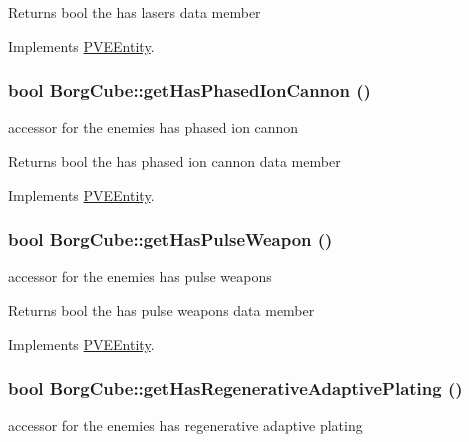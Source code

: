 \begin{DoxyReturn}{Returns}
bool the has lasers data member 
\end{DoxyReturn}


Implements \hyperlink{classPVEEntity}{PVEEntity}.

\hypertarget{classBorgCube_af7010edc4afc7ab22fe8bc8294156478}{
\subsubsection[{getHasPhasedIonCannon}]{\setlength{\rightskip}{0pt plus 5cm}bool BorgCube::getHasPhasedIonCannon ()}}
\label{d2/d93/classBorgCube_af7010edc4afc7ab22fe8bc8294156478}
accessor for the enemies has phased ion cannon

\begin{DoxyReturn}{Returns}
bool the has phased ion cannon data member 
\end{DoxyReturn}


Implements \hyperlink{classPVEEntity}{PVEEntity}.

\hypertarget{classBorgCube_aff18909b84ec3efb8aa26b6a3aa6cba0}{
\subsubsection[{getHasPulseWeapon}]{\setlength{\rightskip}{0pt plus 5cm}bool BorgCube::getHasPulseWeapon ()}}
\label{d2/d93/classBorgCube_aff18909b84ec3efb8aa26b6a3aa6cba0}
accessor for the enemies has pulse weapons

\begin{DoxyReturn}{Returns}
bool the has pulse weapons data member 
\end{DoxyReturn}


Implements \hyperlink{classPVEEntity}{PVEEntity}.

\hypertarget{classBorgCube_abd8457ff37b980ca21e58dee957046cb}{
\subsubsection[{getHasRegenerativeAdaptivePlating}]{\setlength{\rightskip}{0pt plus 5cm}bool BorgCube::getHasRegenerativeAdaptivePlating ()}}
\label{d2/d93/classBorgCube_abd8457ff37b980ca21e58dee957046cb}
accessor for the enemies has regenerative adaptive plating


